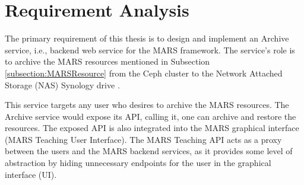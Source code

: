 \newpage
\chapter{Requirement Analysis}
\label{chap:ReqAnalysis}
 The primary requirement of this thesis is to design and implement an Archive service, i.e., backend web service for the MARS framework. The service's role is to
 archive the MARS resources mentioned in Subsection \ref{subsection:MARSResource} from the Ceph cluster \cite{Ceph} to the 
 Network Attached Storage (NAS) Synology drive \cite{Synology}.

 This service targets any user who desires to archive the MARS resources. The Archive service would expose its API, calling it, one can archive and restore the resources. The exposed
 API is also integrated into the MARS graphical interface (MARS Teaching User Interface). The MARS Teaching API acts as a proxy between the users 
 and the MARS backend services, as it provides some level of abstraction by hiding unnecessary endpoints for the user in the graphical interface (UI).



